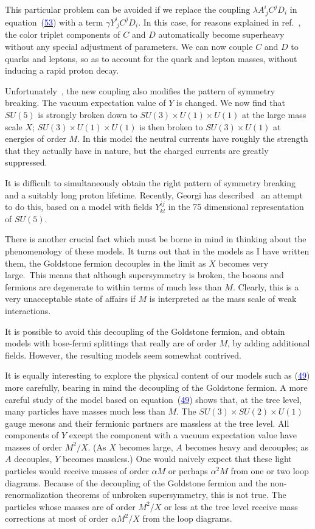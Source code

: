 \documentclass[11pt,a4paper]{article}
\newcommand{\eqnref}[1]{(\hyperlink{eq:#1}{\textcolor{blue}{#1}})}
\newcommand{\asteriskfootnotemark}{\footnotemark[1]}
\begin{document}
This particular problem can be avoided if we replace the coupling
$\lambda A^i_{\ j} C^j D_i$ in equation~\eqnref{53} with a term $\gamma Y^i_{\ j} C^j D_i$. In this case,
for reasons explained in ref.~\cite{ref14}, the color triplet components
of $C$ and $D$ automatically become superheavy without any special
adjustment of parameters. We can now couple $C$ and $D$ to quarks and
leptons, so as to account for the quark and lepton masses, without
inducing a rapid proton decay.

Unfortunately~\cite{ref14}, the new coupling also modifies the pattern of
symmetry breaking. The vacuum expectation value of $Y$ is changed.
We now find that $SU(5)$ is strongly broken down to $SU(3) \times U(1) \times U(1)$
at the large mass scale $X$; $SU(3) \times U(1) \times U(1)$ is then broken to
$SU(3) \times U(1)$ at energies of order $M$. In this model the neutral
currents have roughly the strength that they actually have in nature,
but the charged currents are greatly suppressed.

It is difficult to simultaneously obtain the right pattern of
symmetry breaking and a suitably long proton lifetime. Recently,
Georgi has described~\cite{ref18} an attempt to do this, based on a model with
fields $Y^{ij}_{kl}$ in the 75 dimensional representation of $SU(5)$.

There is another crucial fact which must be borne in mind in
thinking about the phenomenology of these models. It turns out that
in the models as I have written them, the Goldstone fermion decouples
in the limit as $X$ becomes very large.\asteriskfootnotemark\ This means that although
supersymmetry is broken, the bosons and fermions are degenerate to
within terms of much less than $M$. Clearly, this is a very unacceptable
state of affairs if $M$ is interpreted as the mass scale of weak
interactions.

It is possible to avoid this decoupling of the Goldstone fermion,
and obtain models with bose-fermi splittings that really are of order
$M$, by adding additional fields. However, the resulting models seem
somewhat contrived.

It is equally interesting to explore the physical content of
our models such as \eqnref{49} more carefully, bearing in mind the decoupling
of the Goldstone fermion. A more careful study of the model
based on equation~\eqnref{49} shows that, at the tree level, many particles
have masses much less than $M$. The $SU(3) \times SU(2) \times U(1)$ gauge mesons
and their fermionic partners are massless at the tree level. All
components of $Y$ except the component with a vacuum expectation value
have masses of order $M^2/X$. (As $X$ becomes large, $A$ becomes heavy and
decouples; as $A$ decouples, $Y$ becomes massless.) One would naively
expect that these light particles would receive masses of order $\alpha M$
or perhaps $\alpha^2 M$ from one or two loop diagrams. Because of the
decoupling of the Goldstone fermion and the non-renormalization theorems
of unbroken supersymmetry, this is not true. The particles
whose masses are of order $M^2/X$ or less at the tree level receive mass
corrections at most of order $\alpha M^2/X$ from the loop diagrams.
\end{document}
